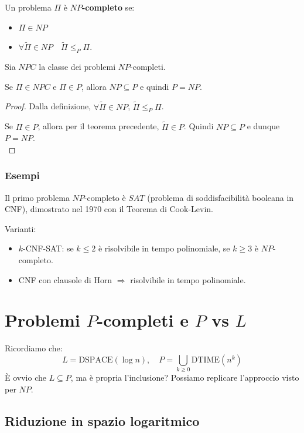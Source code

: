 Un problema $ \Pi $ è \textbf{$NP$-completo} se:
\begin{itemize}
    \item $\Pi \in NP$
    
    \item $\forall \widetilde{\Pi} \in NP \quad \widetilde{\Pi} \leq_P \Pi$.
\end{itemize}

Sia $NPC$ la classe dei problemi $NP$-completi. \\

\begin{theor}
Se $\Pi \in NPC$ e $\Pi \in P$, allora $NP \subseteq P$ e quindi $P = NP$.
\end{theor}

\begin{proof}
Dalla definizione, $\forall \widetilde{\Pi} \in NP$, $\widetilde{\Pi} \leq_P \Pi$.

Se $\Pi \in P$, allora per il teorema precedente, $\widetilde{\Pi} \in P$. Quindi $NP \subseteq P$ e dunque $P = NP$. \\
\end{proof}

\subsubsection{Esempi}

Il primo problema $NP$-completo è $SAT$ (problema di soddisfacibilità booleana in CNF), dimostrato nel 1970 con il Teorema di Cook-Levin.

Varianti:
\begin{itemize}
    \item $k$-CNF-SAT: se $k \leq 2$ è risolvibile in tempo polinomiale, se $k \geq 3$ è $NP$-completo.
    
    \item CNF con clausole di Horn $\Rightarrow$ risolvibile in tempo polinomiale.
\end{itemize}

\section{Problemi $P$-completi e $P$ vs $L$}

Ricordiamo che:
\[
L = \text{DSPACE}(\log n), \quad P = \bigcup_{k \geq 0} \text{DTIME}(n^k)
\]
È ovvio che $L \subseteq P$, ma è propria l'inclusione? Possiamo replicare l'approccio visto per $NP$.

\subsection{Riduzione in spazio logaritmico}

